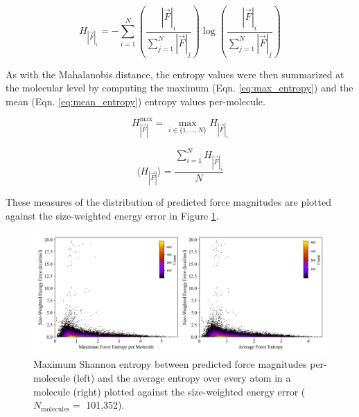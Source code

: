 \begin{equation}
    H_{|\vec{F}|_i} = - \sum_{i=1}^{N} \left( \frac{|\vec{F}|_i}{\sum_{j=1}^{N} |\vec{F}|_j} \right) \log \left( \frac{|\vec{F}|_i}{\sum_{j=1}^{N} |\vec{F}|_j} \right)
    \label{eq:entropy}
\end{equation}

As with the Mahalanobis distance, the entropy values were then summarized at the molecular level by computing the maximum (Eqn. \ref{eq:max_entropy}) and the mean (Eqn. \ref{eq:mean_entropy}) entropy values per-molecule. 

\begin{equation}
    H_{|\vec{F}|}^{\max} = \max_{i \in \{1, \dots, N\}} H_{|\vec{F}|_i}
    \label{eq:max_entropy}
\end{equation}

\begin{equation}
    \langle H_{|\vec{F}|} \rangle = \frac{\sum_{i=1}^{N} H_{|\vec{F}|_i}}{N}
    \label{eq:mean_entropy}
\end{equation}

These measures of the distribution of predicted force magnitudes are plotted against the size-weighted energy error in Figure \ref{fig:entropy}.

\begin{figure}[!ht]
    \centering
    \includegraphics[width=1\linewidth]{Images/2xr_forces/force_entropy-vs-energy.png}
    \caption[Shannon entropy of ensemble predictions of force magnitude (COMP6v1)]{Maximum Shannon entropy between predicted force magnitudes per-molecule (left) and the average entropy over every atom in a molecule (right) plotted against the size-weighted energy error ($N_\text{molecules}=$ 101,352).}
    \label{fig:entropy}
\end{figure}

